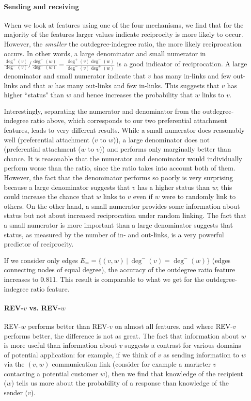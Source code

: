 \documentclass[conference]{IEEEtran}
\begin{document}
\paragraph{Sending and receiving}
When we look at features using one of the four mechanisms, we find that for the majority of the features larger values indicate reciprocity is more likely to occur.  However, the \emph{smaller} the outdegree-indegree ratio, the more likely reciprocation occurs. 
In other words, a large denominator and small numerator in $\frac{\deg^+(v)}{\deg^-(v)} / \frac{\deg^+(w)}{\deg^-(w)} = \frac{\deg^+(v)\deg^-(w)}{\deg^-(v)\deg^+(w)}$ is a good indicator of reciprocation. A large denominator and small numerator indicate that $v$ has many in-links and few out-links and that $w$ has many out-links and few in-links. This suggests that $v$ has higher ``status" than $w$ and hence increases the probability that $w$ links to $v$.

Interestingly, separating the numerator and denominator from the
outdegree-indegree ratio above, which corresponds to our two
preferential attachment features, leads to very different
results.  While a small numerator does reasonably well (preferential
attachment ($v$ to $w$)), a large denominator does not (preferential
attachment ($w$ to $v$)) and performs only marginally better than
chance. It is reasonable that the numerator and denominator would 
individually perform worse than the ratio, since the ratio takes into
account both of them. However, the fact that the denominator performs
so poorly is very surprising because a large denominator suggests
that $v$ has a higher status than $w$; this could increase the
chance that $w$ links to $v$ even if $w$ were to randomly link to
others. On the other hand, a small numerator provides some information
about status but not about increased reciprocation under 
random linking. The fact that a small numerator is more important than
a large denominator suggests that status, as measured by the number of in-
and out-links, is a very powerful predictor of reciprocity.

If we consider only edges $E_= = \{(v,w)~|~\deg^-(v) = \deg^-(w)\}$ (edges connecting nodes of equal degree), 
the accuracy of the outdegree ratio feature increases to 0.811. 
This result is comparable to what we get for the outdegree-indegree ratio feature.
\paragraph{REV-$v$ vs. REV-$w$}
REV-$w$ performs better than REV-$v$ on almost all features, and where REV-$v$ performs better, 
the difference is not as great.
The fact that information about $w$ is more useful than information
about $v$ suggests a contrast for various domains of
potential application: for example, if we think of $v$ as sending 
information to $w$ via the $(v,w)$ communication link (consider for example
a marketer $v$ contacting a potential customer $w$), then we find
that knowledge of the recipient ($w$) tells us more about the 
probability of a response than knowledge of the sender ($v$).
\end{document}

